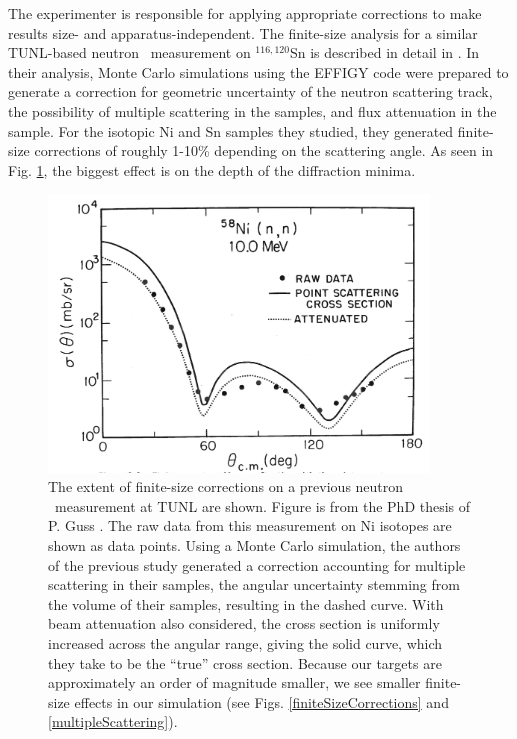The experimenter is responsible
for applying appropriate corrections to make results size- and
apparatus-independent. The finite-size analysis for
a similar TUNL-based neutron \el\ measurement on $^{116,120}$Sn is described in detail
in \cite{GussPhDThesis}. In their analysis, Monte Carlo simulations using the
EFFIGY code were
prepared to generate a correction for geometric uncertainty of the neutron
scattering track, the possibility of multiple scattering
in the samples, and flux attenuation in the sample.
For the isotopic Ni and Sn samples they studied, they generated finite-size
corrections of roughly 1-10\% depending on the scattering angle. As seen in
Fig. \ref{GussFiniteSizeEffect}, the
biggest effect is on the depth of the diffraction minima.
\begin{figure}[tb]
    \centering
    \includegraphics[width=0.9\textwidth, trim={0 0.1cm 0 0}, clip]{figures/GussFiniteSizeEffect.png}
    \caption[Effect of finite-size corrections on previous TUNL neutron \el\ measurement]
    {
        The extent of \gls{finite-size corrections} on a previous neutron \el\ measurement at
        TUNL are shown. Figure is from the PhD thesis of P. Guss \cite{GussPhDThesis}.
        The raw data from this measurement on Ni isotopes are shown as data
        points. Using a Monte Carlo simulation, the authors of the previous
        study generated a correction accounting for multiple scattering in
        their samples, the angular uncertainty stemming from the volume
        of their samples, resulting in the dashed curve. With beam
        attenuation also considered, the cross section is uniformly
        increased across the angular range, giving the solid curve, which
        they take to be the ``true'' cross section. Because our targets are
        approximately an order of magnitude smaller, we see smaller
        finite-size effects in our simulation (see Figs.
        \ref{finiteSizeCorrections} and \ref{multipleScattering}).
    }
    \label{GussFiniteSizeEffect}
\end{figure}

